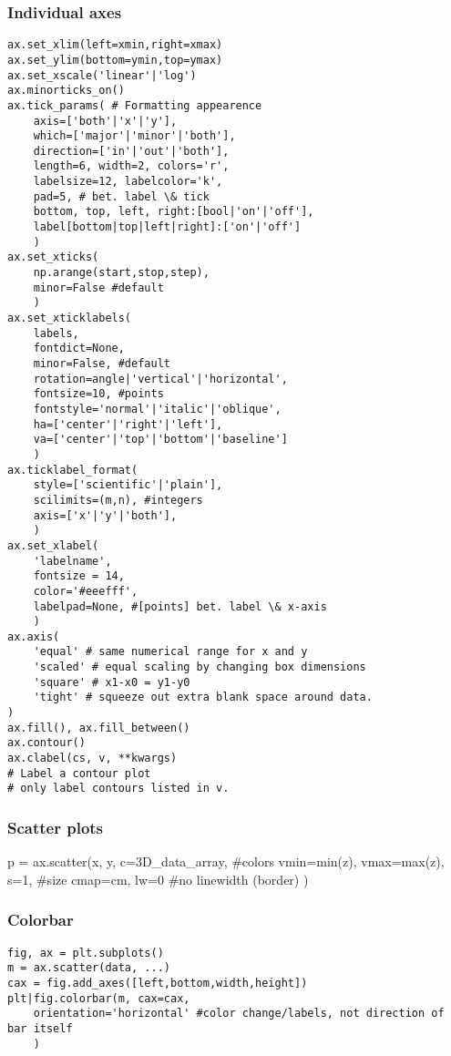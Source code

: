 \documentclass{article}
\begin{document}
\begin{multicols}{2}
\subsubsection{Individual axes}
\begin{lstlisting}
ax.set_xlim(left=xmin,right=xmax)
ax.set_ylim(bottom=ymin,top=ymax)
ax.set_xscale('linear'|'log')
ax.minorticks_on()
ax.tick_params( # Formatting appearence
    axis=['both'|'x'|'y'],
    which=['major'|'minor'|'both'],
    direction=['in'|'out'|'both'],
    length=6, width=2, colors='r',
    labelsize=12, labelcolor='k',
    pad=5, # bet. label \& tick
    bottom, top, left, right:[bool|'on'|'off'],
    label[bottom|top|left|right]:['on'|'off']
    )
ax.set_xticks(
    np.arange(start,stop,step),
    minor=False #default
    )
ax.set_xticklabels(
    labels,
    fontdict=None,
    minor=False, #default
    rotation=angle|'vertical'|'horizontal',
    fontsize=10, #points
    fontstyle='normal'|'italic'|'oblique',
    ha=['center'|'right'|'left'],
    va=['center'|'top'|'bottom'|'baseline']
    )
ax.ticklabel_format(
    style=['scientific'|'plain'],
    scilimits=(m,n), #integers
    axis=['x'|'y'|'both'],
    )
ax.set_xlabel(
    'labelname',
    fontsize = 14,
    color='#eeefff',
    labelpad=None, #[points] bet. label \& x-axis
    )
ax.axis(
    'equal' # same numerical range for x and y
    'scaled' # equal scaling by changing box dimensions
    'square' # x1-x0 = y1-y0
    'tight' # squeeze out extra blank space around data.
)
ax.fill(), ax.fill_between()
ax.contour()
ax.clabel(cs, v, **kwargs)
# Label a contour plot
# only label contours listed in v.
\end{lstlisting}

\newpage
\subsubsection{Scatter plots}
p = ax.scatter(x, y,
    c=3D_data_array, #colors
    vmin=min(z), vmax=max(z),
    s=1, #size
    cmap=cm,
    lw=0 #no linewidth (border)
    )

\subsubsection{Colorbar}
\begin{lstlisting}
fig, ax = plt.subplots()
m = ax.scatter(data, ...)
cax = fig.add_axes([left,bottom,width,height])
plt|fig.colorbar(m, cax=cax,
    orientation='horizontal' #color change/labels, not direction of bar itself
    )
\end{lstlisting}


\end{multicols}
\end{document}
